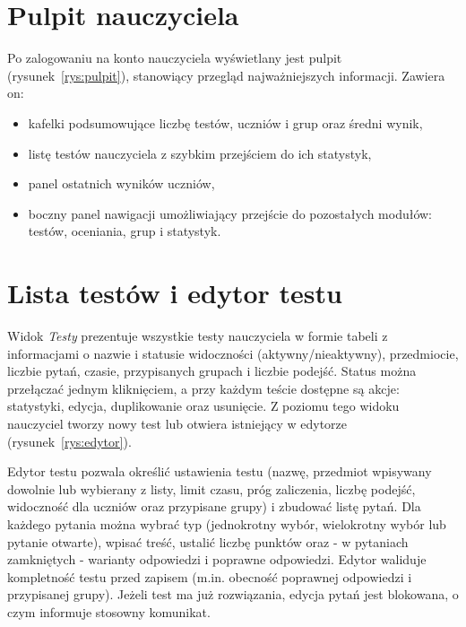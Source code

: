\section{Pulpit nauczyciela}
\label{sec:pulpit}

Po zalogowaniu na konto nauczyciela wyświetlany jest pulpit (rysunek~\ref{rys:pulpit}),
stanowiący przegląd najważniejszych informacji. Zawiera on:

\begin{itemize}
  \item kafelki podsumowujące liczbę testów, uczniów i grup oraz średni wynik,
  \item listę testów nauczyciela z szybkim przejściem do ich statystyk,
  \item panel ostatnich wyników uczniów,
  \item boczny panel nawigacji umożliwiający przejście do pozostałych modułów: testów, oceniania,
        grup i statystyk.
\end{itemize}


\section{Lista testów i edytor testu}
\label{sec:edytor}

Widok \emph{Testy} prezentuje wszystkie testy nauczyciela w formie tabeli z informacjami o nazwie
i statusie widoczności (aktywny/nieaktywny), przedmiocie, liczbie pytań, czasie, przypisanych grupach
i liczbie podejść. Status można przełączać jednym kliknięciem, a przy każdym teście dostępne są
akcje: statystyki, edycja, duplikowanie oraz usunięcie. Z poziomu tego widoku nauczyciel tworzy nowy
test lub otwiera istniejący w edytorze (rysunek~\ref{rys:edytor}).

Edytor testu pozwala określić ustawienia testu (nazwę, przedmiot wpisywany dowolnie lub wybierany
z listy, limit czasu, próg zaliczenia, liczbę podejść, widoczność dla uczniów oraz przypisane grupy)
i zbudować listę pytań. Dla każdego pytania można wybrać typ (jednokrotny wybór, wielokrotny wybór
lub pytanie otwarte), wpisać treść, ustalić liczbę punktów oraz - w pytaniach zamkniętych -
warianty odpowiedzi i poprawne odpowiedzi. Edytor waliduje kompletność testu przed zapisem (m.in.
obecność poprawnej odpowiedzi i przypisanej grupy). Jeżeli test ma już rozwiązania, edycja pytań
jest blokowana, o czym informuje stosowny komunikat.

